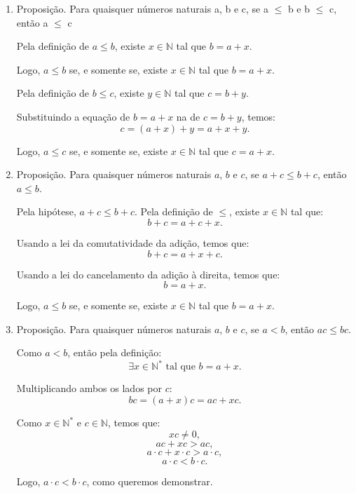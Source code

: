 \documentclass[12pt,a4paper]{article}
\begin{document}
    \begin{enumerate}[label= (\alph*)]
        \item Proposição. Para quaisquer números naturais a, b e c, se a $\leq$ b e b $\leq$ c, então a $\leq$ c

        Pela definição de $a\leq b$, existe $x\in\mathbb{N}$ tal que $b=a+x$.

        Logo, $a \leq b$ se, e somente se, existe $x \in \mathbb{N}$ tal que $b = a + x$.

        Pela definição de $b \leq c$, existe $y \in \mathbb{N}$ tal que $c = b + y$.

        Substituindo a equação de $b = a + x$ na de $c = b + y$, temos:
        \[c = (a + x) + y = a + x + y.\]
        
        Logo, $a \leq c$ se, e somente se, existe $x \in \mathbb{N}$ tal que $c = a + x$.
        
    \item Proposição. Para quaisquer números naturais $a$, $b$ e $c$, se $a + c \leq b + c$, então $a \leq b$.
        
        Pela hipótese, $a + c \leq b + c$. Pela definição de $\leq$, existe $x \in \mathbb{N}$ tal que:
        \[b + c = a + c + x.\]

        Usando a lei da comutatividade da adição, temos que:
        \[b + c = a + x + c.\]

        Usando a lei do cancelamento da adição à direita, temos que:
        \[b = a + x.\]
        
        Logo, $a \leq b$ se, e somente se, existe $x \in \mathbb{N}$ tal que $b = a + x$.
        
    \item Proposição. Para quaisquer números naturais $a$, $b$ e $c$, se $a < b$, então $ac \leq bc$.
        
        Como $a < b$, então pela definição:
        \[\exists x \in \mathbb{N}^* \text{ tal que } b = a + x.\]

        Multiplicando ambos os lados por $c$:
        \[bc = (a + x)c = ac + xc.\]

        Como $x \in \mathbb{N}^*$ e $c \in \mathbb{N}$, temos que:
        \[xc \neq 0,\]
        \[ac + xc > ac,\]
        \[a \cdot c + x \cdot c > a \cdot c,\]
        \[a \cdot c < b \cdot c.\]
        
        Logo, $a \cdot c < b \cdot c$, como queremos demonstrar.
    \end{enumerate}
    
\end{document}
